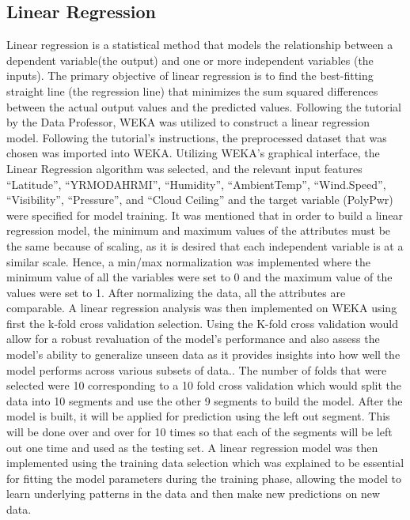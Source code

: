 \documentclass[10pt,twocolumn]{article}
\begin{document}
\subsection{Linear Regression }
Linear regression is a statistical method that models the relationship between a dependent variable(the output) and one or more independent variables (the inputs). The primary objective of linear regression is to find the best-fitting straight line (the regression line) that minimizes the sum squared differences between the actual output values and the predicted values. Following the tutorial by the Data Professor,  WEKA was utilized to construct a linear regression model.  Following the tutorial’s instructions, the preprocessed dataset that was chosen was imported into WEKA. Utilizing WEKA's graphical interface, the Linear Regression algorithm was selected, and the relevant input features “Latitude”, “YRMODAHRMI”, “Humidity”, “AmbientTemp”, “Wind.Speed”, “Visibility”, “Pressure”, and “Cloud Ceiling'' and the target variable (PolyPwr) were specified for model training. It was mentioned that  in order to build a linear regression model, the minimum and maximum values of the attributes must be the same because of scaling, as it is desired that each independent variable is at a similar scale. Hence, a min/max normalization was implemented where the minimum value of all the variables were set to 0 and the maximum value of the values were set to 1. After normalizing the data, all the attributes are comparable. A linear regression analysis was then implemented on WEKA using first the k-fold cross validation selection. Using the K-fold cross validation would allow for a robust revaluation of the model’s performance and also assess the model’s ability to generalize unseen data as it provides insights into how well the model performs across various subsets of data.. The number of folds that were selected were 10 corresponding to a 10 fold cross validation which would split the data into 10 segments and use the other 9 segments to build the model. After the model is built, it will be applied for prediction using the left out segment. This will be done over and over for 10 times so that each of the segments will be left out one time and used as the testing set. A linear regression model was then implemented using the training data selection which was explained to be essential for fitting the model parameters during the training phase, allowing the model to learn underlying patterns in the data and then make new predictions on new data.
\end{document}
